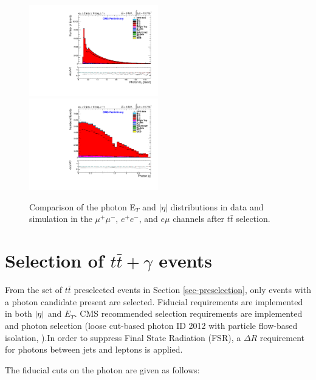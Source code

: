 \begin{figure}
\includegraphics[width=0.5\textwidth]{Plots/ControlPlots/TTbarDiLeptonAnalysis/EMu/Photons/AllPhotons/Photon_ET_splitTTbar_ratio.pdf}
\includegraphics[width=0.5\textwidth]{Plots/ControlPlots/TTbarDiLeptonAnalysis/EMu/Photons/AllPhotons/Photon_AbsEta_splitTTbar_ratio.pdf}
\caption{Comparison of the photon E$_{T}$ and $|\eta|$ distributions in data and simulation in the $\mu^{+}\mu^{-}$, $e^{+}e^{-}$, and $e\mu$ channels after $t\bar{t}$ selection.}
\label{fig-ttbarETandEta}
\end{figure}

\section{Selection of $t\bar{t}+\gamma$ events} \label{sec-postselection}

From the set of $t\bar{t}$ preselected events in Section \ref{sec-preselection}, only events with a photon candidate present are selected.  Fiducial requirements are implemented in both $\lvert \eta \rvert$ and $E_T$. CMS recommended selection requirements are implemented and photon selection (loose cut-based photon ID 2012 with particle flow-based isolation, \cite{CutBasedIsolation2012}).In order to suppress Final State Radiation (FSR), a $\Delta R$ requirement for photons between jets and leptons is applied.

The fiducial cuts on the photon are given as follows:

